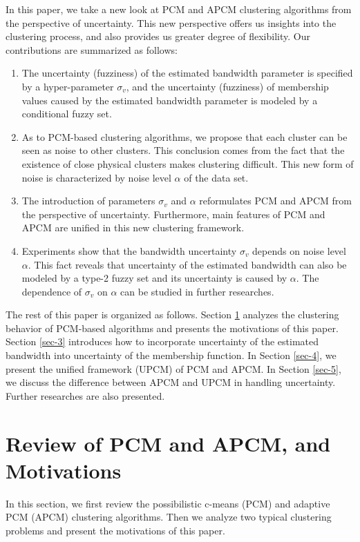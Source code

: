 \documentclass[journal,transmag]{IEEEtran}
\begin{document}
In this paper, we take a new look at PCM and APCM clustering algorithms from the perspective of uncertainty. This new perspective offers us insights into the clustering process, and also provides us greater degree of flexibility.
Our contributions are summarized as follows:
\begin{enumerate}
\item The uncertainty (fuzziness) of the estimated bandwidth parameter is specified by a hyper-parameter $\sigma_v$, and the uncertainty (fuzziness) of membership values caused by the estimated bandwidth parameter is modeled by a conditional fuzzy set.
\item As to PCM-based clustering algorithms, we propose that each cluster can be seen as noise to other clusters. This conclusion comes from the fact that the existence of close physical clusters makes clustering difficult. This new form of noise is characterized by noise level $\alpha$ of the data set.
\item The introduction of parameters $\sigma_v$ and $\alpha$ reformulates PCM and APCM from the perspective of uncertainty. Furthermore, main features of PCM and APCM are unified in this new clustering framework.
\item Experiments show that the bandwidth uncertainty $\sigma_v$ depends on noise level $\alpha$.
This fact reveals that uncertainty of the estimated bandwidth can also be modeled by a type-2 fuzzy set and its uncertainty is caused by $\alpha$. The dependence of $\sigma_v$ on $\alpha$ can be studied in further researches.
\end{enumerate}

The rest of this paper is organized as follows. Section \ref{sec-2} analyzes the clustering behavior of PCM-based algorithms and presents the motivations of this paper. Section \ref{sec-3} introduces how to incorporate uncertainty of the estimated bandwidth into uncertainty of the membership function. In Section \ref{sec-4}, we present the unified framework (UPCM) of PCM and APCM. In Section \ref{sec-5}, we discuss the difference between APCM and UPCM in handling uncertainty. Further researches are also presented.
\section{Review of PCM and APCM, and Motivations}
\label{sec-2}
In this section, we first review the possibilistic c-means (PCM) and adaptive PCM (APCM) clustering algorithms. Then we analyze two typical clustering problems and present the motivations of this paper.
\end{document}
